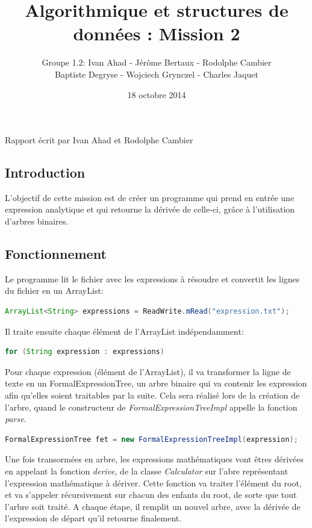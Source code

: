 \documentclass[a4paper]{article}
\title{Algorithmique et structures de données : Mission 2}
\date{18 octobre 2014}
\author{Groupe 1.2: Ivan Ahad - Jérôme Bertaux - Rodolphe Cambier \\ 
	Baptiste Degryse - Wojciech Grynczel - Charles Jaquet}
\begin{document}
\maketitle



Rapport écrit par Ivan Ahad et Rodolphe Cambier

\subsection*{Introduction}

L'objectif de cette mission est de créer un programme qui prend en entrée une expression analytique et qui retourne la dérivée de celle-ci, grâce à l'utilisation d'arbres binaires. 

\subsection*{Fonctionnement}

Le programme lit le fichier avec les expressions à résoudre et convertit les lignes du fichier en un ArrayList: 
\begin{lstlisting}[language=Java]
ArrayList<String> expressions = ReadWrite.mRead("expression.txt");
\end{lstlisting}

Il traite ensuite chaque élément de l'ArrayList indépendamment:
\begin{lstlisting}[language=Java]
for (String expression : expressions)
\end{lstlisting}

Pour chaque expression (élément de l'ArrayList), il va transformer la ligne de texte en un FormalExpressionTree, un arbre binaire qui va contenir les expression afin qu'elles soient traitables par la suite. Cela sera réalisé lors de la création de l'arbre, quand le constructeur de\textit{ FormalExpressionTreeImpl} appelle la fonction \textit{parse}.
\begin{lstlisting}[language=Java]
FormalExpressionTree fet = new FormalExpressionTreeImpl(expression);
\end{lstlisting}
						
Une fois transormées en arbre, les expressions mathématiques vont êtres dérivées en appelant la fonction \textit{derive}, de la classe \textit{Calculator} sur l'abre représentant l'expression mathématique à dériver. Cette fonction va traiter l'élément du root, et va s'appeler récursivement sur chacun des enfants du root, de sorte que tout l'arbre soit traité. A chaque étape, il remplit un nouvel arbre, avec la dérivée de l'expression de départ qu'il retourne finalement.
\end{document}
